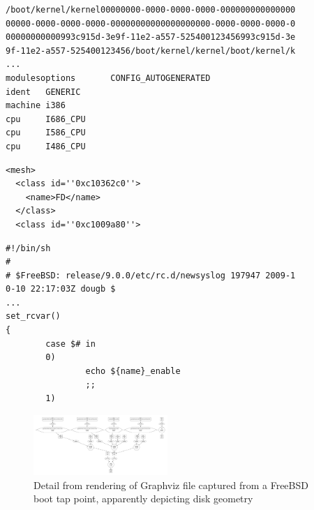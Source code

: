 \begin{verbatim}
/boot/kernel/kernel00000000-0000-0000-0000-000000000000000
00000-0000-0000-0000-00000000000000000000-0000-0000-0000-0
00000000000993c915d-3e9f-11e2-a557-525400123456993c915d-3e
9f-11e2-a557-525400123456/boot/kernel/kernel/boot/kernel/k
...
modulesoptions       CONFIG_AUTOGENERATED
ident   GENERIC
machine i386
cpu     I686_CPU
cpu     I586_CPU
cpu     I486_CPU
\end{verbatim}

\begin{verbatim}
<mesh>
  <class id=''0xc10362c0''>
    <name>FD</name>
  </class>
  <class id=''0xc1009a80''>
\end{verbatim}

\begin{verbatim}
#!/bin/sh
#
# $FreeBSD: release/9.0.0/etc/rc.d/newsyslog 197947 2009-1
0-10 22:17:03Z dougb $
...
set_rcvar()
{
        case $# in
        0)
                echo ${name}_enable
                ;;
        1)
\end{verbatim}


\begin{figure}[t]
    \begin{center}
        \includegraphics[width=2in]{figures/freebsd_graphviz.pdf}
    \end{center}
    \caption{Detail from rendering of Graphviz file captured from a FreeBSD
boot tap point, apparently depicting disk geometry}
    \label{fig:graphviz}
\end{figure}




